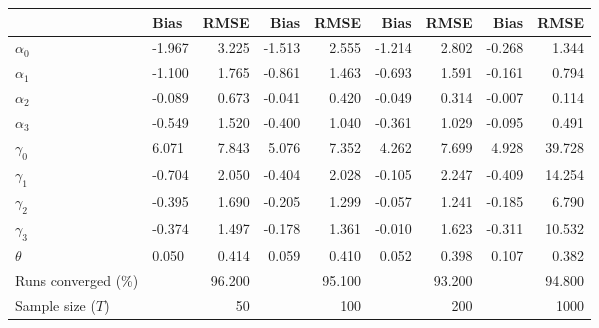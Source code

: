 
\begin{tabular}[t]{llrrrrrrr}
\toprule
  & Bias & RMSE & Bias & RMSE & Bias & RMSE & Bias & RMSE\\
\midrule
$\alpha_{0}$ & -1.967 & 3.225 & -1.513 & 2.555 & -1.214 & 2.802 & -0.268 & 1.344\\
$\alpha_{1}$ & -1.100 & 1.765 & -0.861 & 1.463 & -0.693 & 1.591 & -0.161 & 0.794\\
$\alpha_{2}$ & -0.089 & 0.673 & -0.041 & 0.420 & -0.049 & 0.314 & -0.007 & 0.114\\
$\alpha_{3}$ & -0.549 & 1.520 & -0.400 & 1.040 & -0.361 & 1.029 & -0.095 & 0.491\\
$\gamma_{0}$ & 6.071 & 7.843 & 5.076 & 7.352 & 4.262 & 7.699 & 4.928 & 39.728\\
$\gamma_{1}$ & -0.704 & 2.050 & -0.404 & 2.028 & -0.105 & 2.247 & -0.409 & 14.254\\
$\gamma_{2}$ & -0.395 & 1.690 & -0.205 & 1.299 & -0.057 & 1.241 & -0.185 & 6.790\\
$\gamma_{3}$ & -0.374 & 1.497 & -0.178 & 1.361 & -0.010 & 1.623 & -0.311 & 10.532\\
$\theta$ & 0.050 & 0.414 & 0.059 & 0.410 & 0.052 & 0.398 & 0.107 & 0.382\\
Runs converged (\%) &  & 96.200 &  & 95.100 &  & 93.200 &  & 94.800\\
Sample size ($T$) &  & 50 &  & 100 &  & 200 &  & 1000\\
\bottomrule
\end{tabular}
